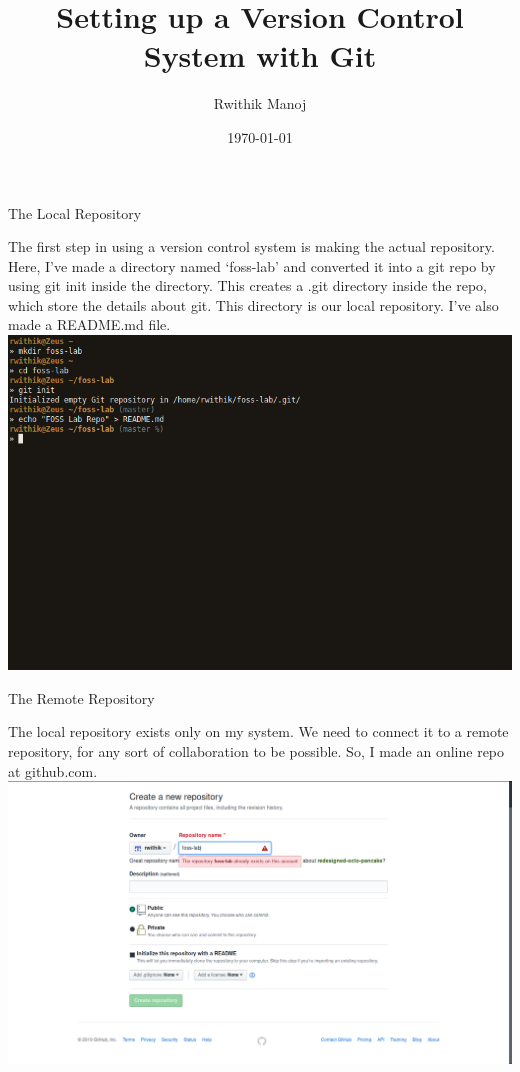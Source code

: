\documentclass[10pt,a4paper,titlepage]{report}
\begin{document}
\begin{titlepage}
\author{Rwithik Manoj}
\title{Setting up a Version Control System with Git}
\date{\today}
\maketitle
\end{titlepage}
\begin{center}
\Large{The Local Repository}
\end{center}
\vspace{.5cm}
\par The first step in using a version control system is making the actual repository. Here, I've made a directory named `foss-lab' and converted it into a git repo by using {\color{red} git init} inside the directory. This creates a .git directory inside the repo, which store the details about git. This directory is our local repository. I've also made a README.md file. \newline
\newline
\includegraphics[scale=0.5]{../Images/VCS/1.png}
\pagebreak
\begin{center}
\Large{The Remote Repository}
\end{center}
\vspace{.5cm}
\par The local repository exists only on my system. We need to connect it to a remote repository, for any sort of collaboration to be possible. So, I made an online repo at github.com. \newline\newline
\includegraphics[scale=.25]{../Images/VCS/github.png}\newline
\end{document}
